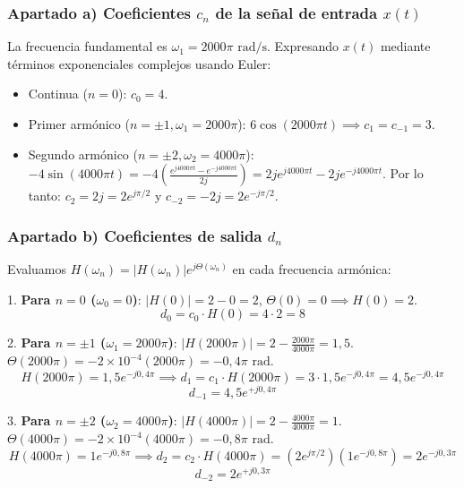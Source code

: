 \begin{resolucion}
\subsubsection*{Apartado a) Coeficientes $c_n$ de la señal de entrada $x(t)$}

La frecuencia fundamental es $\omega_1 = 2000\pi\text{ rad/s}$.
Expresando $x(t)$ mediante términos exponenciales complejos usando Euler:
\begin{itemize}
    \item Continua ($n = 0$): $c_0 = 4$.
    \item Primer armónico ($n = \pm 1, \omega_1 = 2000\pi$): $6\cos(2000\pi t) \implies c_1 = c_{-1} = 3$.
    \item Segundo armónico ($n = \pm 2, \omega_2 = 4000\pi$): $-4\sin(4000\pi t) = -4 \left(\frac{e^{j4000\pi t} - e^{-j4000\pi t}}{2j}\right) = 2j e^{j4000\pi t} - 2j e^{-j4000\pi t}$.
      Por lo tanto: $c_2 = 2j = 2 e^{j\pi/2}$ y $c_{-2} = -2j = 2 e^{-j\pi/2}$.
\end{itemize}

\subsubsection*{Apartado b) Coeficientes de salida $d_n$}

Evaluamos $H(\omega_n) = |H(\omega_n)| e^{j \Theta(\omega_n)}$ en cada frecuencia armónica:

1. \textbf{Para $n = 0$ ($\omega_0 = 0$)}:
   $|H(0)| = 2 - 0 = 2$, $\Theta(0) = 0 \implies H(0) = 2$.
   \[
   d_0 = c_0 \cdot H(0) = 4 \cdot 2 = 8
   \]

2. \textbf{Para $n = \pm 1$ ($\omega_1 = 2000\pi$)}:
   $|H(2000\pi)| = 2 - \frac{2000\pi}{4000\pi} = 1{,}5$.
   $\Theta(2000\pi) = -2\times 10^{-4} (2000\pi) = -0{,}4\pi\text{ rad}$.
   \[
   H(2000\pi) = 1{,}5 e^{-j 0{,}4\pi} \implies d_1 = c_1 \cdot H(2000\pi) = 3 \cdot 1{,}5 e^{-j 0{,}4\pi} = 4{,}5 e^{-j 0{,}4\pi}
   \]
   \[
   d_{-1} = 4{,}5 e^{+j 0{,}4\pi}
   \]

3. \textbf{Para $n = \pm 2$ ($\omega_2 = 4000\pi$)}:
   $|H(4000\pi)| = 2 - \frac{4000\pi}{4000\pi} = 1$.
   $\Theta(4000\pi) = -2\times 10^{-4} (4000\pi) = -0{,}8\pi\text{ rad}$.
   \[
   H(4000\pi) = 1 e^{-j 0{,}8\pi} \implies d_2 = c_2 \cdot H(4000\pi) = (2 e^{j\pi/2}) (1 e^{-j 0{,}8\pi}) = 2 e^{-j 0{,}3\pi}
   \]
   \[
   d_{-2} = 2 e^{+j 0{,}3\pi}
   \]



\end{resolucion}
